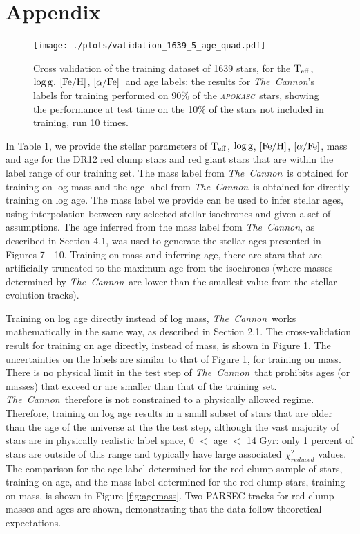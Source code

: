 \documentclass[12pt, preprint]{aastex}
\newcommand{\project}[1]{\textsl{#1}}
\newcommand{\tc}{\project{The~Cannon}}
\newcommand{\apokasc}{\project{\textsc{apokasc}}}
\newcommand{\teff}{\mbox{$\rm T_{eff}$}}
\newcommand{\feh}{\mbox{$\rm [Fe/H]$}}
\newcommand{\alphafe}{\mbox{$\rm [\alpha/Fe]$}}
\newcommand{\logg}{\mbox{$\rm \log g$}}
\begin{document}
\section*{Appendix}

\begin{figure}[h]
\centering
        \texttt{[image: ./plots/validation\_1639\_5\_age\_quad.pdf]}
  \caption{Cross validation of the training dataset of 1639 stars, for the \teff, \logg, \feh, \alphafe\ and age labels: the results for \tc's labels for training performed on 90\% of the \apokasc\ stars, showing the performance at test time on the 10\% of the stars not included in training, run 10 times.}
\label{fig:validation2}
\end{figure}


In Table 1, we provide the stellar parameters of \teff, \logg, \feh, \alphafe, mass and age for the DR12 red clump stars and red giant stars that are within the label range of our training set. The mass label from \tc\ is obtained for training on log mass and the age label from \tc\ is obtained for directly training on log age.  The mass label we provide can be used to infer stellar ages, using interpolation between any selected stellar isochrones and given a set of assumptions. The age inferred from the mass label from \tc, as described in Section 4.1, was used to generate the stellar ages presented in Figures 7 - 10. Training on mass and inferring age, there are stars that are artificially truncated to the maximum age from the isochrones (where masses determined by \tc\ are lower than the smallest value from the stellar evolution tracks). 

Training on log age directly instead of log mass,  \tc\ works mathematically in the same way, as described in Section 2.1. The cross-validation result for training on age directly, instead of mass, is shown in Figure \ref{fig:validation2}. The uncertainties on the labels are similar to that of Figure 1, for training on mass. There is no physical limit in the test step of \tc\ that prohibits ages (or masses) that exceed or are smaller than that of the training set. 
\tc\ therefore is not constrained to a physically allowed regime. Therefore, training on log age results in a small subset of stars that are older than the age of the universe at the the test step, although the vast majority of stars are in physically realistic label space, 0 $<$ age $<$ 14 Gyr: only 1 percent of stars are outside of this range and typically have large associated $\chi^2_{reduced}$ values.  The comparison for the age-label determined for the red clump sample of stars, training on age, and the mass label determined for the red clump stars, training on mass, is shown in Figure \ref{fig:agemass}. Two PARSEC tracks for red clump masses and ages are shown, demonstrating that the data follow theoretical expectations. 
\end{document}
